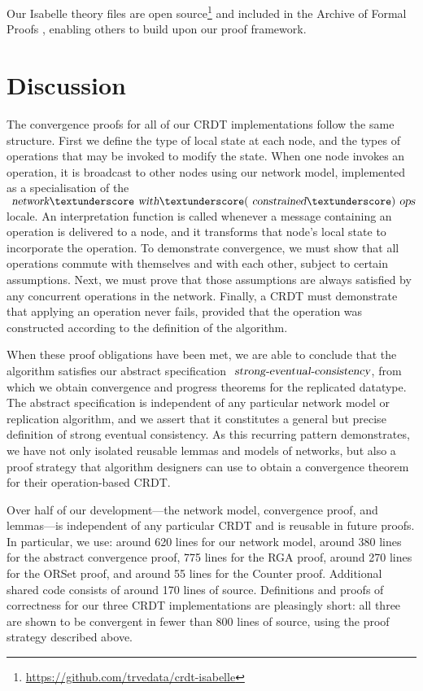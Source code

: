 \documentclass[acmsmall,screen]{acmart}
\begin{document}
Our Isabelle theory files are open source\footnote{\url{https://github.com/trvedata/crdt-isabelle}} and included in the Archive of Formal Proofs \cite{CRDT-AFP}, enabling others to build upon our proof framework.









\section{Discussion}
\label{sect.discussion}

The convergence proofs for all of our CRDT implementations follow the same structure.
First we define the type of local state at each node, and the types of operations that may be invoked to modify the state.
When one node invokes an operation, it is broadcast to other nodes using our network model, implemented as a specialisation of the $\isa{network}{\isacharunderscore}\isa{with}{\isacharunderscore}(\isa{constrained}{\isacharunderscore})\isa{ops}$ locale.
An interpretation function is called whenever a message containing an operation is delivered to a node, and it transforms that node's local state to incorporate the operation.
To demonstrate convergence, we must show that all operations commute with themselves and with each other, subject to certain assumptions.
Next, we must prove that those assumptions are always satisfied by any concurrent operations in the network.
Finally, a CRDT must demonstrate that applying an operation never fails, provided that the operation was constructed according to the definition of the algorithm.

When these proof obligations have been met, we are able to conclude that the algorithm satisfies our abstract specification $\isa{strong-eventual-consistency}$, from which we obtain convergence and progress theorems for the replicated datatype.
The abstract specification is independent of any particular network model or replication algorithm, and we assert that it constitutes a general but precise definition of strong eventual consistency.
As this recurring pattern demonstrates, we have not only isolated reusable lemmas and models of networks, but also a proof strategy that algorithm designers can use to obtain a convergence theorem for their operation-based CRDT.

Over half of our development---the network model, convergence proof, and lemmas---is independent of any particular CRDT and is reusable in future proofs.
In particular, we use: around 620 lines for our network model, around 380 lines for the abstract convergence proof, 775 lines for the RGA proof, around 270 lines for the ORSet proof, and around 55 lines for the Counter proof.
Additional shared code consists of around 170 lines of source.
Definitions and proofs of correctness for our three CRDT implementations are pleasingly short: all three are shown to be convergent in fewer than 800 lines of source, using the proof strategy described above. 
\end{document}

